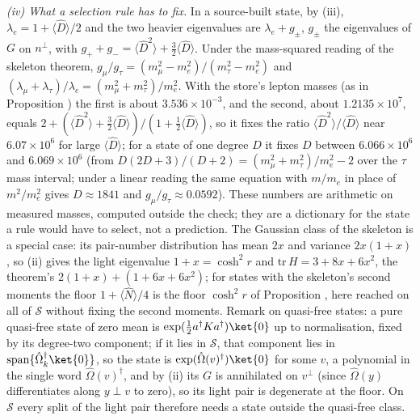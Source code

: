 \emph{(iv) What a selection rule has to fix.} In a source-built state, by (iii), $\lambda_{e} = 1 + \langle\hat{D}\rangle/2$ and the two heavier eigenvalues are $\lambda_{e} + g_{\pm}$, $g_{\pm}$ the eigenvalues of $G$ on $n^{\perp}$, with $g_{+} + g_{-} = \langle\hat{D}^{2}\rangle + \tfrac32\langle\hat{D}\rangle$. Under the mass-squared reading of the skeleton theorem, $g_{\mu}/g_{\tau} = (m_{\mu}^{2} - m_{e}^{2})/(m_{\tau}^{2} - m_{e}^{2})$ and $(\lambda_{\mu} + \lambda_{\tau})/\lambda_{e} = (m_{\mu}^{2} + m_{\tau}^{2})/m_{e}^{2}$. With the store's lepton masses (as in Proposition ) the first is about $3.536 \times 10^{-3}$, and the second, about $1.2135 \times 10^{7}$, equals $2 + (\langle\hat{D}^{2}\rangle + \tfrac32\langle\hat{D}\rangle)/(1 + \tfrac12\langle\hat{D}\rangle)$, so it fixes the ratio $\langle\hat{D}^{2}\rangle/\langle\hat{D}\rangle$ near $6.07 \times 10^{6}$ for large $\langle\hat{D}\rangle$; for a state of one degree $D$ it fixes $D$ between $6.066 \times 10^{6}$ and $6.069 \times 10^{6}$ (from $D(2D + 3)/(D + 2) = (m_{\mu}^{2} + m_{\tau}^{2})/m_{e}^{2} - 2$ over the $\tau$ mass interval; under a linear reading the same equation with $m/m_{e}$ in place of $m^{2}/m_{e}^{2}$ gives $D \approx 1841$ and $g_{\mu}/g_{\tau} \approx 0.0592$). These numbers are arithmetic on measured masses, computed outside the check; they are a dictionary for the state a rule would have to select, not a prediction. The Gaussian class of the skeleton is a special case: its pair-number distribution has mean $2x$ and variance $2x(1 + x)$, so (ii) gives the light eigenvalue $1 + x = \cosh^{2}r$ and $\mathrm{tr}\,H = 3 + 8x + 6x^{2}$, the theorem's $2(1 + x) + (1 + 6x + 6x^{2})$; for states with the skeleton's second moments the floor $1 + \langle\hat{N}\rangle/4$ is the floor $\cosh^{2}r$ of Proposition , here reached on all of $\mathcal{S}$ without fixing the second moments. Remark on quasi-free states: a pure quasi-free state of zero mean is $\exp(\tfrac12 a^{\dagger}Ka^{\dagger})\ket{0}$ up to normalisation, fixed by its degree-two component; if it lies in $\mathcal{S}$, that component lies in $\mathrm{span}\{\hat\Omega_{k}^{\dagger}\ket{0}\}$, so the state is $\exp(\hat\Omega(v)^{\dagger})\ket{0}$ for some $v$, a polynomial in the single word $\hat\Omega(v)^{\dagger}$, and by (ii) its $G$ is annihilated on $v^{\perp}$ (since $\hat\Omega(y)$ differentiates along $y \perp v$ to zero), so its light pair is degenerate at the floor. On $\mathcal{S}$ every split of the light pair therefore needs a state outside the quasi-free class.
